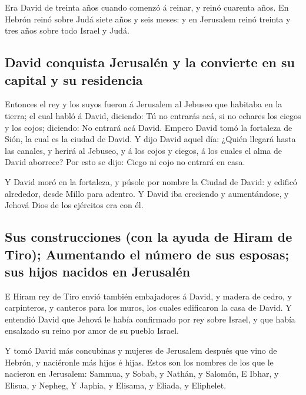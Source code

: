  Era David de treinta años cuando comenzó á reinar, y reinó
cuarenta años.  En Hebrón reinó sobre Judá siete años y seis
meses: y en Jerusalem reinó treinta y tres años sobre todo Israel y
Judá.

\hypertarget{david-conquista-jerusaluxe9n-y-la-convierte-en-su-capital-y-su-residencia}{%
\subsection{David conquista Jerusalén y la convierte en su capital y su
residencia}\label{david-conquista-jerusaluxe9n-y-la-convierte-en-su-capital-y-su-residencia}}

 Entonces el rey y los suyos fueron á Jerusalem al Jebuseo
que habitaba en la tierra; el cual habló á David, diciendo: Tú no
entrarás acá, si no echares los ciegos y los cojos; diciendo: No entrará
acá David.  Empero David tomó la fortaleza de Sión, la cual
es la ciudad de David.  Y dijo David aquel día: ¿Quién
llegará hasta las canales, y herirá al Jebuseo, y á los cojos y ciegos,
á los cuales el alma de David aborrece? Por esto se dijo: Ciego ni cojo
no entrará en casa.

 Y David moró en la fortaleza, y púsole por nombre la Ciudad
de David: y edificó alrededor, desde Millo para adentro.  Y
David iba creciendo y aumentándose, y Jehová Dios de los ejércitos era
con él.

\hypertarget{sus-construcciones-con-la-ayuda-de-hiram-de-tiro-aumentando-el-nuxfamero-de-sus-esposas-sus-hijos-nacidos-en-jerusaluxe9n}{%
\subsection{Sus construcciones (con la ayuda de Hiram de Tiro);
Aumentando el número de sus esposas; sus hijos nacidos en
Jerusalén}\label{sus-construcciones-con-la-ayuda-de-hiram-de-tiro-aumentando-el-nuxfamero-de-sus-esposas-sus-hijos-nacidos-en-jerusaluxe9n}}

 E Hiram rey de Tiro envió también embajadores á David, y
madera de cedro, y carpinteros, y canteros para los muros, los cuales
edificaron la casa de David.  Y entendió David que Jehová
le había confirmado por rey sobre Israel, y que había ensalzado su reino
por amor de su pueblo Israel.

 Y tomó David más concubinas y mujeres de Jerusalem después
que vino de Hebrón, y naciéronle más hijos é hijas.  Estos
son los nombres de los que le nacieron en Jerusalem: Sammua, y Sobab, y
Nathán, y Salomón,  E Ibhar, y Elisua, y Nepheg,
 Y Japhia, y Elisama, y Eliada, y Eliphelet.

